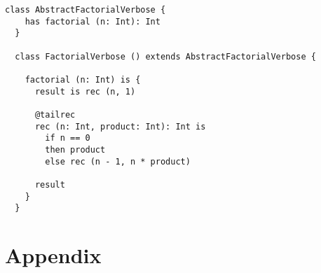 \documentclass[12pt,a4paper]{book}
\begin{document}
    \begin{lstlisting}[label={lst:exampleFactorialVerbose}]
  class AbstractFactorialVerbose {
    has factorial (n: Int): Int
  }

  class FactorialVerbose () extends AbstractFactorialVerbose {

    factorial (n: Int) is {
      result is rec (n, 1)

      @tailrec
      rec (n: Int, product: Int): Int is
        if n == 0
        then product
        else rec (n - 1, n * product)

      result
    }
  }
    \end{lstlisting}


    \chapter{Appendix}
\end{document}
